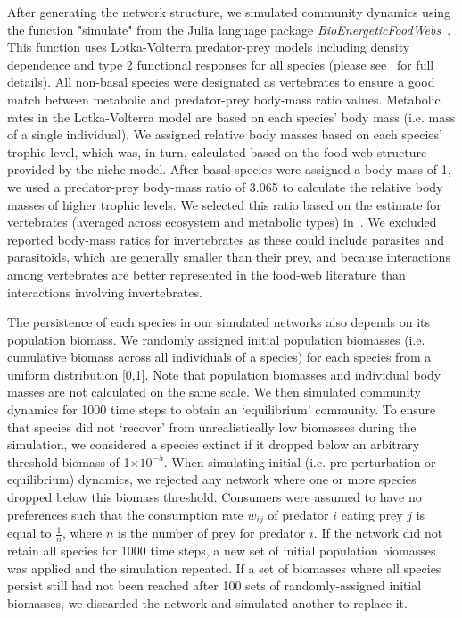 \documentclass[12pt]{article}
\begin{document}
	After generating the network structure, we simulated community dynamics using the function "simulate" from the Julia language package \emph{BioEnergeticFoodWebs}~\citep{bioenergeticfw,Delmas2017}. This function uses Lotka-Volterra predator-prey models including density dependence and type 2 functional responses for all species (please see~\citet{Delmas2017} for full details).
	All non-basal species were designated as vertebrates to ensure a good match between metabolic and predator-prey body-mass ratio values. Metabolic rates in the Lotka-Volterra model are based on each species' body mass (i.e. mass of a single individual). We assigned relative body masses based on each species' trophic level, which was, in turn, calculated based on the food-web structure provided by the niche model. After basal species were assigned a body mass of 1, we used a predator-prey body-mass ratio of 3.065 to calculate the relative body masses of higher trophic levels. We selected this ratio based on the estimate for vertebrates (averaged across ecosystem and metabolic types) in~\citet{Brose2006}. We excluded reported body-mass ratios for invertebrates as these could include parasites and parasitoids, which are generally smaller than their prey, and because interactions among vertebrates are better represented in the food-web literature than interactions involving invertebrates.
	
	
	The persistence of each species in our simulated networks also depends on its population biomass. 
	We randomly assigned initial population biomasses (i.e. cumulative biomass across all individuals of a species) for each species from a uniform distribution [0,1]. Note that population biomasses and individual body masses are not calculated on the same scale. We then simulated community dynamics for 1000 time steps to obtain an `equilibrium' community. To ensure that species did not `recover' from unrealistically low biomasses during the simulation, we considered a species extinct if it dropped below an arbitrary threshold biomass of 1$\times10^{-5}$. When simulating initial (i.e. pre-perturbation or equilibrium) dynamics, we rejected any network where one or more species dropped below this biomass threshold. Consumers were assumed to have no preferences such that the consumption rate $w_{ij}$ of predator $i$ eating prey $j$ is equal to $\frac{1}{n}$, where $n$ is the number of prey for predator $i$. If the network did not retain all species for 1000 time steps, a new set of initial population biomasses was applied and the simulation repeated.
	If a set of biomasses where all species persist still had not been reached after 100 sets of randomly-assigned initial biomasses, we discarded the network and simulated another to replace it.
\end{document}
